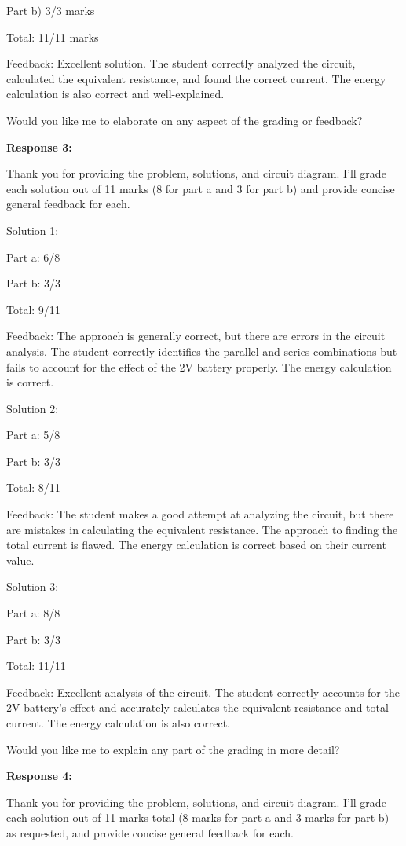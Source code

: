 \documentclass[a4paper,11pt]{article}
\begin{document}
Part b) 3/3 marks

Total: 11/11 marks

Feedback: Excellent solution. The student correctly analyzed the circuit, calculated the equivalent resistance, and found the correct current. The energy calculation is also correct and well-explained.

Would you like me to elaborate on any aspect of the grading or feedback?

\bigskip
\textbf{Response 3:}

Thank you for providing the problem, solutions, and circuit diagram. I'll grade each solution out of 11 marks (8 for part a and 3 for part b) and provide concise general feedback for each.

Solution 1:

Part a: 6/8

Part b: 3/3

Total: 9/11

Feedback: The approach is generally correct, but there are errors in the circuit analysis. The student correctly identifies the parallel and series combinations but fails to account for the effect of the 2V battery properly. The energy calculation is correct.

Solution 2:

Part a: 5/8

Part b: 3/3

Total: 8/11

Feedback: The student makes a good attempt at analyzing the circuit, but there are mistakes in calculating the equivalent resistance. The approach to finding the total current is flawed. The energy calculation is correct based on their current value.

Solution 3:

Part a: 8/8

Part b: 3/3

Total: 11/11

Feedback: Excellent analysis of the circuit. The student correctly accounts for the 2V battery's effect and accurately calculates the equivalent resistance and total current. The energy calculation is also correct.

Would you like me to explain any part of the grading in more detail?

\bigskip
\textbf{Response 4:}

Thank you for providing the problem, solutions, and circuit diagram. I'll grade each solution out of 11 marks total (8 marks for part a and 3 marks for part b) as requested, and provide concise general feedback for each.
\end{document}

